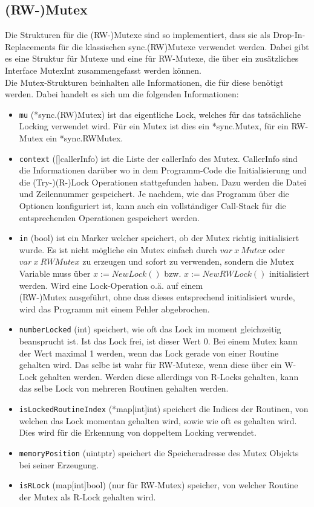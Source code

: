 \subsection{(RW-)Mutex}
Die Strukturen für die (RW-)Mutexe sind so implementiert, dass sie als 
Drop-In-Replacements für die klassischen sync.(RW)Mutexe verwendet werden.
Dabei gibt es eine Struktur für Mutexe und eine für RW-Mutexe, die über ein 
zusätzliches Interface MutexInt zusammengefasst werden können.\\
Die Mutex-Strukturen beinhalten alle Informationen, die für diese benötigt werden.
Dabei handelt es sich um die folgenden Informationen:
\begin{itemize}[leftmargin=1.3em]
  \item \texttt{mu} (*sync.(RW)Mutex) ist das eigentliche Lock, welches für das tatsächliche Locking 
      verwendet wird. Für ein Mutex ist dies ein *sync.Mutex, für ein RW-Mutex
      ein *sync.RWMutex.
  \item \texttt{context} ([]callerInfo) ist die Liste der callerInfo des Mutex.
    CallerInfo sind die Informationen darüber wo in dem Programm-Code die 
    Initialisierung und die (Try-)(R-)Lock Operationen stattgefunden haben. 
    Dazu werden die Datei und Zeilennummer gespeichert. Je nachdem, wie das 
    Programm über die Optionen konfiguriert ist, kann auch ein vollständiger 
    Call-Stack für die entsprechenden Operationen gespeichert werden. 
  \item \texttt{in} (bool) ist ein Marker welcher speichert, ob der Mutex richtig 
      initialisiert wurde. Es ist nicht mögliche ein Mutex einfach durch 
      $var\ x\ Mutex$ oder $var\ x\ RWMutex$ zu erzeugen und sofort zu verwenden, 
      sondern die Mutex Variable muss über $x := NewLock()$ bzw. 
      $x := NewRWLock()$ initialisiert werden. Wird eine Lock-Operation o.ä. 
      auf einem\\(RW-)Mutex ausgeführt, ohne dass dieses entsprechend initialisiert
      wurde, wird das Programm mit einem Fehler abgebrochen.
  \item \texttt{numberLocked} (int) speichert, wie oft das Lock im 
      moment gleichzeitig beansprucht ist. Ist das Lock frei, ist dieser Wert $0$.
      Bei einem Mutex kann der Wert maximal 1 werden, wenn das Lock gerade von 
      einer Routine gehalten wird. Das selbe ist wahr für RW-Mutexe, wenn diese 
      über ein W-Lock gehalten werden. Werden diese allerdings von 
      R-Locks gehalten, kann das selbe Lock von mehreren Routinen gehalten 
      werden.
  \item \texttt{isLockedRoutineIndex} (*map[int]int) speichert die Indices der Routinen, von 
    welchen das Lock momentan gehalten wird, sowie wie oft es gehalten wird. 
    Dies wird für die Erkennung von doppeltem Locking verwendet.
  \item \texttt{memoryPosition} (uintptr) speichert die Speicheradresse des 
    Mutex Objekts bei seiner Erzeugung.
  \item \texttt{isRLock} (map[int]bool) (nur für RW-Mutex) speicher, von welcher Routine 
    der Mutex als R-Lock gehalten wird.
\end{itemize}

